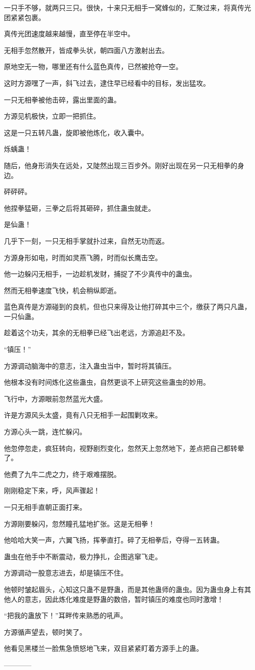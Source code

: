 \begin{this_body}
一只手不够，就两只三只。很快，十来只无相手一窝蜂似的，汇聚过来，将真传光团紧紧包裹。

真传光团速度越来越慢，直至停在半空中。

无相手忽然散开，皆成拳头状，朝四面八方激射出去。

原地空无一物，哪里还有什么蓝色真传，已然被抢夺一空。

这时方源嘿了一声，斜飞过去，逮住早已经看中的目标，发出猛攻。

一只无相拳被他击碎，露出里面的蛊。

方源见机极快，立即一把抓住。

这是一只五转凡蛊，旋即被他炼化，收入囊中。

烁蝺蛊！

随后，他身形消失在远处，又陡然出现三百步外。刚好出现在另一只无相拳的身边。

砰砰砰。

他捏拳猛砸，三拳之后将其砸碎，抓住蛊虫就走。

是仙蛊！

几乎下一刻，一只无相手掌就扑过来，自然无功而返。

方源身形如电，时而如灵燕飞腾，时而似长鹰击空。

他一边躲闪无相手，一边趁机发财，捕捉了不少真传中的蛊虫。

然而无相拳速度飞快，机会稍纵即逝。

蓝色真传是方源碰到的良机，但也只来得及让他打碎其中三个，缴获了两只凡蛊，一只仙蛊。

趁着这个功夫，其余的无相拳已经飞出老远，方源追赶不及。

“镇压！”

方源调动脑海中的意志，注入蛊虫当中，暂时将其镇压。

他根本没有时间炼化这些蛊虫，自然更谈不上研究这些蛊虫的妙用。

飞行中，方源眼前忽然蓝光大盛。

许是方源风头太盛，竟有八只无相手一起围剿攻来。

方源心头一跳，连忙躲闪。

他忽停忽走，疯狂转向，视野剧烈变化，忽然天上忽然地下，差点把自己都转晕了。

他费了九牛二虎之力，终于艰难摆脱。

刚刚稳定下来，呼，风声骤起！

一只无相手直朝正面打来。

方源刚要躲闪，忽然瞳孔猛地扩张。这是无相拳！

他哈哈大笑一声，六翼飞扬，挥拳直打。碎了无相拳后，夺得一五转蛊。

蛊虫在他手中不断震动，极力挣扎，企图逃窜飞走。

方源调动一股意志进去，却是镇压不住。

他顿时皱起眉头，心知这只蛊不是野蛊，而是其他蛊师的蛊虫。因为蛊虫身上有其他人的意志，因此炼化难度是野蛊的数倍，暂时镇压的难度也同时激增！

“把我的蛊放下！”耳畔传来熟悉的吼声。

方源循声望去，顿时笑了。

他看见黑楼兰一脸焦急愤怒地飞来，双目紧紧盯着方源手上的蛊。

------------

\end{this_body}

